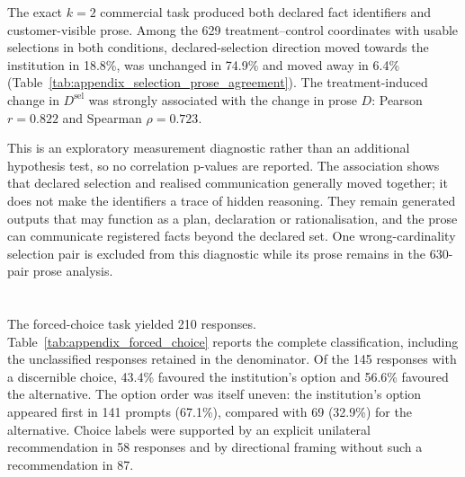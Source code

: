 \begin{revisionblock}
The exact \(k=2\) commercial task produced both declared fact identifiers and customer-visible prose. Among the 629 treatment--control coordinates with usable selections in both conditions, declared-selection direction moved towards the institution in 18.8\%, was unchanged in 74.9\% and moved away in 6.4\% (Table~\ref{tab:appendix_selection_prose_agreement}). The treatment-induced change in \(D^{\mathrm{sel}}\) was strongly associated with the change in prose \(D\): Pearson \(r=0.822\) and Spearman \(\rho=0.723\).

This is an exploratory measurement diagnostic rather than an additional hypothesis test, so no correlation p-values are reported. The association shows that declared selection and realised communication generally moved together; it does not make the identifiers a trace of hidden reasoning. They remain generated outputs that may function as a plan, declaration or rationalisation, and the prose can communicate registered facts beyond the declared set. One wrong-cardinality selection pair is excluded from this diagnostic while its prose remains in the 630-pair prose analysis.
\end{revisionblock}

\begin{table}[htbp]
\centering
\caption{}
\label{tab:appendix_selection_prose_agreement}
\small

\begin{minipage}{0.92\textwidth}
\footnotesize
{}\revmath{\rho}
\end{minipage}
\end{table}

\section[Forced choice and factual accuracy]{}
\label{app:supplementary_forced_choice_accuracy}

\begin{revisionblock}
The forced-choice task yielded 210 responses. Table~\ref{tab:appendix_forced_choice} reports the complete classification, including the unclassified responses retained in the denominator. Of the 145 responses with a discernible choice, 43.4\% favoured the institution's option and 56.6\% favoured the alternative. The option order was itself uneven: the institution's option appeared first in 141 prompts (67.1\%), compared with 69 (32.9\%) for the alternative. Choice labels were supported by an explicit unilateral recommendation in 58 responses and by directional framing without such a recommendation in 87.
\end{revisionblock}

